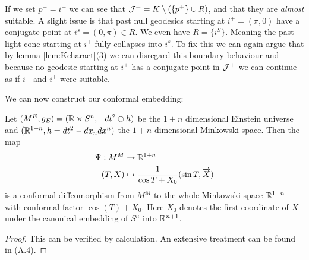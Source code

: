 If we set $p^\pm = i^\pm$ we can see that ${\mathcal{J}}^+ = K \setminus (\{p^+\} \cup R)$, and that they are \emph{almost} suitable. A slight issue is that past null geodesics starting at $i^+=(\pi, 0)$ have a conjugate point at $i^s=(0,\pi)\in R$. We even have $R = \{i^S\}$. Meaning the past light cone starting at $i^+$ fully collapses into $i^s$. To fix this we can again argue that by lemma \ref{lem:Kcharact}(3) we can disregard this boundary behaviour and because no geodesic starting at $i^+$ has a conjugate point in ${\mathcal{J}}^+$ we can continue as if $i^-$ and $i^+$ were suitable.

We can now construct our conformal embedding:
\begin{proposition}
Let $(M^E,g_E)=(\mathbb{R}\times S^n,-dt^2 \oplus h)$ be the $1+n$ dimensional Einstein universe and $(\mathbb{R}^{1+n},h=dt^2-dx_ndx^n)$ the $1+n$ dimensional Minkowski space. Then the map 
\begin{align}
    \Psi:M^M &\to \mathbb{R}^{1+n}\\
    (T,X) &\mapsto\frac{1}{\cos T + X_0}(\sin T,\overrightarrow{X})
\end{align}
is a conformal diffeomorphism from $M^M$ to the whole Minkowski space $\mathbb{R}^{1+n}$ with conformal factor $\cos(T)+X_0$. Here $X_0$ denotes the first coordinate of $X$ under the canonical embedding of $S^n$ into $\mathbb{R}^{n+1}$.
\end{proposition}
\begin{proof}
    This can be verified by calculation. An extensive treatment can be found in \cite{hormander}(A.4).
\end{proof}

